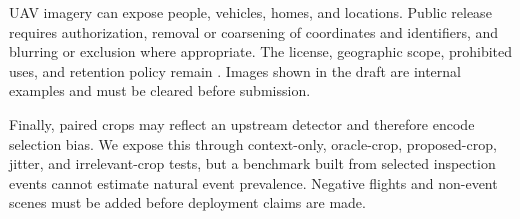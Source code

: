 UAV imagery can expose people, vehicles, homes, and locations. Public release requires authorization, removal or coarsening of coordinates and identifiers, and blurring or exclusion where appropriate. The license, geographic scope, prohibited uses, and retention policy remain \tbd. Images shown in the draft are internal examples and must be cleared before submission.

Finally, paired crops may reflect an upstream detector and therefore encode selection bias. We expose this through context-only, oracle-crop, proposed-crop, jitter, and irrelevant-crop tests, but a benchmark built from selected inspection events cannot estimate natural event prevalence. Negative flights and non-event scenes must be added before deployment claims are made.
